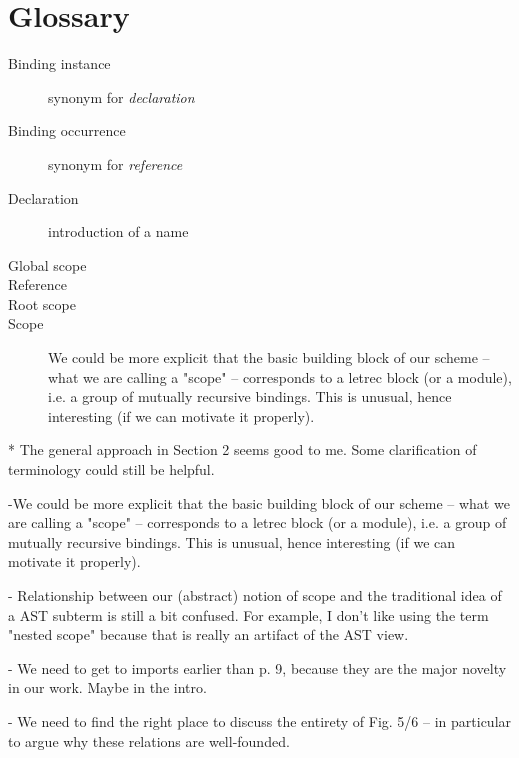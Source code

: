 \section{Glossary}

\begin{description}
\item[Binding instance] synonym for \emph{declaration}
\item[Binding occurrence] synonym for \emph{reference}
\item[Declaration] introduction of a name
\item[Global scope] 
\item[Reference]
\item[Root scope]
\item[Scope] We could be more explicit that the basic building block of our
scheme -- what we are calling a "scope" -- corresponds to a letrec block (or a
module), i.e. a group of mutually recursive bindings.  This is unusual, hence
interesting (if we can motivate it properly).
\end{description}


* The general approach in Section 2 seems good to me.
Some clarification of terminology could still be helpful.

-We could be more explicit that the basic building
block of our scheme -- what we are calling a "scope" --
corresponds to a letrec block (or a module), i.e. a group
of mutually recursive bindings.  This is unusual, hence interesting
(if we can motivate it properly).

- Relationship between our (abstract) notion of scope and
the traditional idea of a  AST subterm is still a bit confused.
For example, I don't like using the term "nested scope" because that
is really an artifact of the AST view.

- We need to get to imports earlier than p. 9, because they
are the major novelty in our work. Maybe in the intro.

- We need to find the right place to discuss the entirety of
Fig. 5/6 -- in particular to argue why these relations are well-founded.